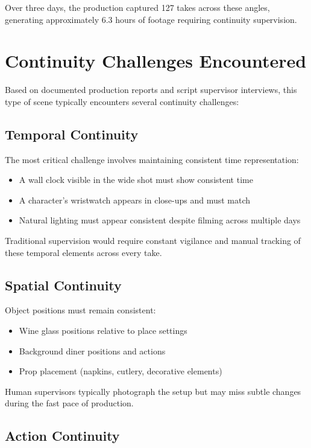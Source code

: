 Over three days, the production captured 127 takes across these angles, generating approximately 6.3 hours of footage requiring continuity supervision.

\section{Continuity Challenges Encountered}
\label{sec:challenges}

Based on documented production reports and script supervisor interviews, this type of scene typically encounters several continuity challenges:

\subsection{Temporal Continuity}
\label{subsec:temporal}

The most critical challenge involves maintaining consistent time representation:
\begin{itemize}
\item A wall clock visible in the wide shot must show consistent time
\item A character's wristwatch appears in close-ups and must match
\item Natural lighting must appear consistent despite filming across multiple days
\end{itemize}

Traditional supervision would require constant vigilance and manual tracking of these temporal elements across every take.

\subsection{Spatial Continuity}
\label{subsec:spatial}

Object positions must remain consistent:
\begin{itemize}
\item Wine glass positions relative to place settings
\item Background diner positions and actions
\item Prop placement (napkins, cutlery, decorative elements)
\end{itemize}

Human supervisors typically photograph the setup but may miss subtle changes during the fast pace of production.

\subsection{Action Continuity}
\label{subsec:action}

